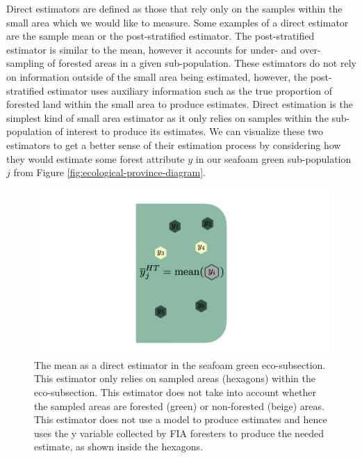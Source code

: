 \documentclass[12pt,twoside]{reedthesis}
\begin{document}
Direct estimators are defined as those that rely only on the samples within the small area which we would like to measure. Some examples of a direct estimator are the sample mean or the post-stratified estimator. The post-stratified estimator is similar to the mean, however it accounts for under- and over-sampling of forested areas in a given sub-population. These estimators do not rely on information outside of the small area being estimated, however, the post-stratified estimator uses auxiliary information such as the true proportion of forested land within the small area to produce estimates. Direct estimation is the simplest kind of small area estimator as it only relies on samples within the sub-population of interest to produce its estimates. We can visualize these two estimators to get a better sense of their estimation process by considering how they would estimate some forest attribute \(y\) in our seafoam green sub-population \(j\) from Figure \ref{fig:ecological-province-diagram}.
\begin{figure}

{\centering \includegraphics[width=1\linewidth]{figure/mean-diagram} 

}

\caption[The mean as a direct estimator]{The mean as a direct estimator in the seafoam green eco-subsection. This estimator only relies on sampled areas (hexagons) within the eco-subsection. This estimator does not take into account whether the sampled areas are forested (green) or non-forested (beige) areas. This estimator does not use a model to produce estimates and hence uses the y variable collected by FIA foresters to produce the needed estimate, as shown inside the hexagons.}\label{fig:mean-diagram}
\end{figure}
\end{document}
